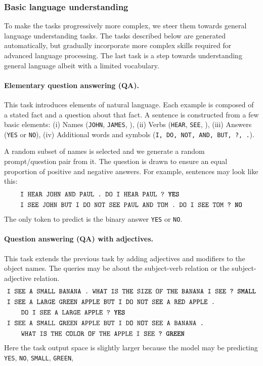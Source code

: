 {\subsubsection{Basic language understanding}
To make the tasks progressively more complex, we steer them towards general
language understanding tasks. The tasks described below  are generated automatically, but gradually incorporate more complex skills
required for advanced language processing.
The last task is a step towards understanding general language albeit with a limited vocabulary.

\paragraph{Elementary question answering (QA).}
This task introduces elements of natural language. Each example is composed of a
stated fact and a question about that fact. A sentence is constructed from a few
basic elements:
(i) Names (\eg\texttt{JOHN}, \texttt{JAMES}, \etc),
(ii) Verbs (\eg\texttt{HEAR}, \texttt{SEE}, \etc),
(iii) Answers (\texttt{YES} or \texttt{NO}),
(iv) Additional words and symbols (\texttt{I, DO, NOT, AND, BUT, ?, .}).

A random subset of names is selected and we generate a random prompt/question
pair from it.
The question is drawn to ensure an equal proportion of
positive and negative answers. For example, sentences may look like this:
{\fontsize{8}{9.6}\selectfont
  \begingroup
\addtolength{\jot}{-.5em}
\begin{align*}
&  \texttt{I HEAR JOHN AND PAUL .}\texttt{ DO I HEAR PAUL ?} \texttt{\textbf{ YES}}\\
&    \texttt{I SEE JOHN BUT I DO NOT SEE PAUL AND TOM . DO I SEE TOM ? \textbf{NO}}
\end{align*}
\endgroup}
The only token to predict is the binary answer \texttt{YES} or \texttt{NO}.

\paragraph{Question answering (QA) with adjectives.}

This task extends the previous task by adding adjectives and modifiers to the
object names. The queries may be about the subject-verb relation or the
subject-adjective relation.
{\fontsize{8}{9.6}\selectfont
  \begingroup
\addtolength{\jot}{-.5em}
\begin{align*}
  &\texttt{I SEE A SMALL BANANA .}\texttt{ WHAT IS THE SIZE OF THE BANANA I SEE ? } \texttt{\textbf{SMALL}}\\
  &  \texttt{I SEE A LARGE GREEN APPLE BUT I DO NOT SEE A RED APPLE .} \\
  & \quad\quad\texttt{DO I SEE A LARGE APPLE ? \textbf{YES}} \\
  &  \texttt{I SEE A SMALL GREEN APPLE BUT I DO NOT SEE A BANANA .}\\
  &\quad\quad\texttt{WHAT IS THE COLOR OF THE APPLE I SEE ? \textbf{GREEN}}
\end{align*}
\endgroup
}
Here the task output space is slightly larger because the model may be
predicting \texttt{YES}, \texttt{NO}, \texttt{SMALL}, \texttt{GREEN}, \etc

}
